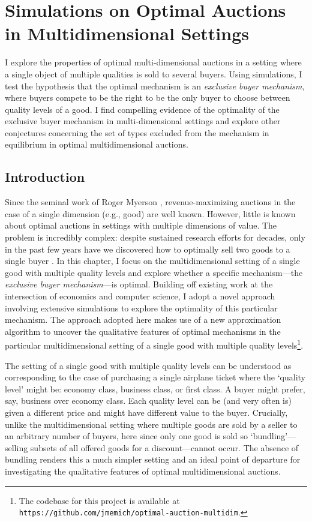 \graphicspath{ {sections/} }

\chapter{Simulations on Optimal Auctions in Multidimensional Settings}\label{ch_auctions}I explore the properties of optimal multi-dimensional auctions in a setting where a single object of multiple qualities is sold to several buyers. Using simulations, I test the hypothesis that the optimal mechanism is an \textit{exclusive buyer mechanism}, where buyers compete to be the right to be the only buyer to choose between quality levels of a good. I find compelling evidence of the optimality of the exclusive buyer mechanism in multi-dimensional settings and explore other conjectures concerning the set of types excluded from the mechanism in equilibrium in optimal multidimensional auctions.

\section{Introduction}

Since the seminal work of Roger Myerson \autocite*{myerson1981optimal}, revenue-maximizing auctions in the case of a single dimension (e.g., good) are well known. However, little is known about optimal auctions in settings with multiple dimensions of value. The problem is incredibly complex: despite sustained research efforts for decades, only in the past few years have we discovered how to optimally sell two goods to a single buyer \autocite{daskalakis2017strong}. In this chapter, I focus on the multidimensional setting of a single good with multiple quality levels and explore whether a specific mechanism---the \textit{exclusive buyer mechanism}---is optimal. Building off existing work at the intersection of economics and computer science, I adopt a novel approach involving extensive simulations to explore the optimality of this particular mechanism. The approach adopted here makes use of a new approximation algorithm to uncover the qualitative features of optimal mechanisms in the particular multidimensional setting of a single good with multiple quality levels\footnote{The codebase for this project is available at \texttt{https://github.com/jmemich/optimal-auction-multidim}.}.

The setting of a single good with multiple quality levels can be understood as corresponding to the case of purchasing a single airplane ticket where the `quality level' might be: economy class, business class, or first class. A buyer might prefer, say, business over economy class. Each quality level can be (and very often is) given a different price and might have different value to the buyer. Crucially, unlike the multidimensional setting where multiple goods are sold by a seller to an arbitrary number of buyers, here since only one good is sold so `bundling'---selling subsets of all offered goods for a discount---cannot occur. The absence of bundling renders this a much simpler setting and an ideal point of departure for investigating the qualitative features of optimal multidimensional auctions.

